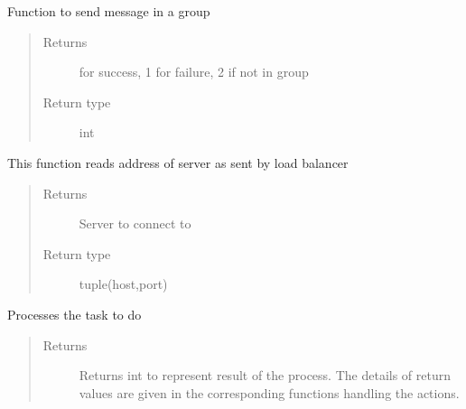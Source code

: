 \documentclass[letterpaper,10pt,english]{sphinxmanual}
\begin{document}
\begin{fulllineitems}
\begin{fulllineitems}
\end{fulllineitems}


\begin{fulllineitems}
\label{\detokenize{Message:Message.Message._send_message_in_group}}
Function to send message in a group
\begin{quote}\begin{description}
\item[{Returns}]  for success, 1 for failure, 2 if not in group

\item[{Return type}] \leavevmode
int

\end{description}\end{quote}

\end{fulllineitems}


\begin{fulllineitems}
\label{\detokenize{Message:Message.Message._get_server_from_lb}}
This function reads address of server as sent by load balancer
\begin{quote}\begin{description}
\item[{Returns}] \leavevmode
Server to connect to

\item[{Return type}] \leavevmode
tuple(host,port)

\end{description}\end{quote}

\end{fulllineitems}


\begin{fulllineitems}
\label{\detokenize{Message:Message.Message.processTask}}
Processes the task to do
\begin{quote}\begin{description}
\item[{Returns}] \leavevmode
Returns int to represent result of the process. The details of return values are given in the corresponding functions handling the actions.


\end{description}
\end{quote}
\end{fulllineitems}
\end{fulllineitems}
\end{document}
